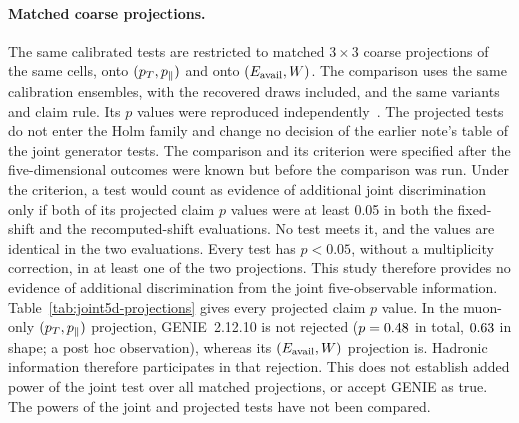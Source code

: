 \paragraph{Matched coarse projections.} The same calibrated tests are restricted to matched $3\times3$ coarse projections of the same cells, onto $(p_{T},p_{\parallel})$ and onto $(E_{\mathrm{avail}},W)$. The comparison uses the same calibration ensembles, with the recovered draws included, and the same variants and claim rule. Its $p$ values were reproduced independently~\cite{JointTestProjections2026}. The projected tests do not enter the Holm family and change no decision of the earlier note's table of the joint generator tests. The comparison and its criterion were specified after the five-dimensional outcomes were known but before the comparison was run. Under the criterion, a test would count as evidence of additional joint discrimination only if both of its projected claim $p$ values were at least 0.05 in both the fixed-shift and the recomputed-shift evaluations. No test meets it, and the values are identical in the two evaluations. Every test has $p<0.05$, without a multiplicity correction, in at least one of the two projections. This study therefore provides no evidence of additional discrimination from the joint five-observable information. Table~\ref{tab:joint5d-projections} gives every projected claim $p$ value. In the muon-only $(p_{T},p_{\parallel})$ projection, GENIE~2.12.10 is not rejected ($p=0.48$ in total, $0.63$ in shape; a post hoc observation), whereas its $(E_{\mathrm{avail}},W)$ projection is. Hadronic information therefore participates in that rejection. This does not establish added power of the joint test over all matched projections, or accept GENIE as true. The powers of the joint and projected tests have not been compared.
